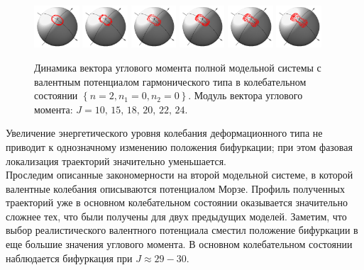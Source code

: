 \begin{figure}[H]
  \centering
	\includegraphics[width=0.15\textwidth]{../pictures/HarmSecondState00/plot_J=10.png}
	\includegraphics[width=0.15\textwidth]{../pictures/HarmSecondState00/plot_J=15.png}
	\includegraphics[width=0.15\textwidth]{../pictures/HarmSecondState00/plot_J=18.png}
	\includegraphics[width=0.15\textwidth]{../pictures/HarmSecondState00/plot_J=20.png}
	\includegraphics[width=0.15\textwidth]{../pictures/HarmSecondState00/plot_J=22.png}
	\includegraphics[width=0.15\textwidth]{../pictures/HarmSecondState00/plot_J=24.png}
	\caption{Динамика вектора углового момента полной модельной системы с валентным потенциалом гармонического типа в колебательном состоянии $\left\{ n = 2, n_1 = 0, n_2 = 0 \right\}$. Модуль вектора углового момента: $J = 10, \, 15, \, 18, \, 20, \, 22, \, 24$.}
\label{ham200}
\end{figure}

Увеличение энергетического уровня колебания деформационного типа не приводит к однозначному изменению положения бифуркации; при этом фазовая локализация траекторий значительно уменьшается. \\
Проследим описанные закономерности на второй модельной системе, в которой валентные колебания описываются потенциалом Морзе. Профиль полученных траекторий уже в основном колебательном состоянии оказывается значительно сложнее тех, что были получены для двух предыдущих моделей. Заметим, что выбор реалистического валентного потенциала сместил положение бифуркации в еще большие значения углового момента. В основном колебательном состоянии наблюдается бифуркация при $J \approx 29-30$.

